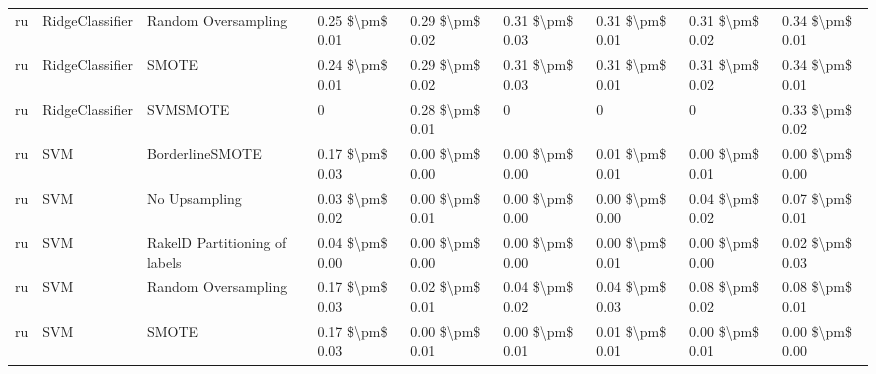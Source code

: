 \begin{tabular}{lllllllll}
      ru &                 RidgeClassifier &           Random Oversampling & 0.25 \$\textbackslash pm\$ 0.01 &           0.29 \$\textbackslash pm\$ 0.02 &       0.31 \$\textbackslash pm\$ 0.03 &        0.31 \$\textbackslash pm\$ 0.01 &                         0.31 \$\textbackslash pm\$ 0.02 &     0.34 \$\textbackslash pm\$ 0.01 \\
      ru &                 RidgeClassifier &                         SMOTE & 0.24 \$\textbackslash pm\$ 0.01 &           0.29 \$\textbackslash pm\$ 0.02 &       0.31 \$\textbackslash pm\$ 0.03 &        0.31 \$\textbackslash pm\$ 0.01 &                         0.31 \$\textbackslash pm\$ 0.02 &     0.34 \$\textbackslash pm\$ 0.01 \\
      ru &                 RidgeClassifier &                      SVMSMOTE &               0 &           0.28 \$\textbackslash pm\$ 0.01 &                     0 &                      0 &                                       0 &     0.33 \$\textbackslash pm\$ 0.02 \\
      ru &                             SVM &               BorderlineSMOTE & 0.17 \$\textbackslash pm\$ 0.03 &           0.00 \$\textbackslash pm\$ 0.00 &       0.00 \$\textbackslash pm\$ 0.00 &        0.01 \$\textbackslash pm\$ 0.01 &                         0.00 \$\textbackslash pm\$ 0.01 &     0.00 \$\textbackslash pm\$ 0.00 \\
      ru &                             SVM &                 No Upsampling & 0.03 \$\textbackslash pm\$ 0.02 &           0.00 \$\textbackslash pm\$ 0.01 &       0.00 \$\textbackslash pm\$ 0.00 &        0.00 \$\textbackslash pm\$ 0.00 &                         0.04 \$\textbackslash pm\$ 0.02 &     0.07 \$\textbackslash pm\$ 0.01 \\
      ru &                             SVM & RakelD Partitioning of labels & 0.04 \$\textbackslash pm\$ 0.00 &           0.00 \$\textbackslash pm\$ 0.00 &       0.00 \$\textbackslash pm\$ 0.00 &        0.00 \$\textbackslash pm\$ 0.01 &                         0.00 \$\textbackslash pm\$ 0.00 &     0.02 \$\textbackslash pm\$ 0.03 \\
      ru &                             SVM &           Random Oversampling & 0.17 \$\textbackslash pm\$ 0.03 &           0.02 \$\textbackslash pm\$ 0.01 &       0.04 \$\textbackslash pm\$ 0.02 &        0.04 \$\textbackslash pm\$ 0.03 &                         0.08 \$\textbackslash pm\$ 0.02 &     0.08 \$\textbackslash pm\$ 0.01 \\
      ru &                             SVM &                         SMOTE & 0.17 \$\textbackslash pm\$ 0.03 &           0.00 \$\textbackslash pm\$ 0.01 &       0.00 \$\textbackslash pm\$ 0.01 &        0.01 \$\textbackslash pm\$ 0.01 &                         0.00 \$\textbackslash pm\$ 0.01 &     0.00 \$\textbackslash pm\$ 0.00 \\

\end{tabular}
